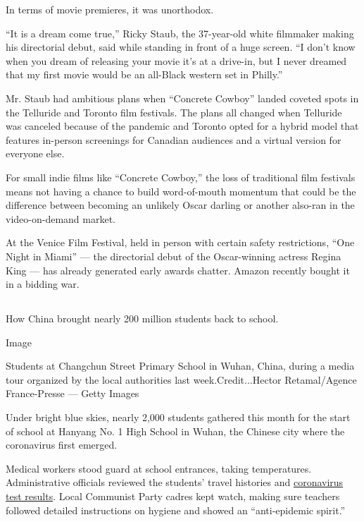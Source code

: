 In terms of movie premieres, it was unorthodox.

``It is a dream come true,'' Ricky Staub, the 37-year-old white
filmmaker making his directorial debut, said while standing in front of
a huge screen. ``I don't know when you dream of releasing your movie
it's at a drive-in, but I never dreamed that my first movie would be an
all-Black western set in Philly.''

Mr. Staub had ambitious plans when ``Concrete Cowboy'' landed coveted
spots in the Telluride and Toronto film festivals. The plans all changed
when Telluride was canceled because of the pandemic and Toronto opted
for a hybrid model that features in-person screenings for Canadian
audiences and a virtual version for everyone else.

For small indie films like ``Concrete Cowboy,'' the loss of traditional
film festivals means not having a chance to build word-of-mouth momentum
that could be the difference between becoming an unlikely Oscar darling
or another also-ran in the video-on-demand market.

At the Venice Film Festival, held in person with certain safety
restrictions, ``One Night in Miami'' --- the directorial debut of the
Oscar-winning actress Regina King --- has already generated early awards
chatter. Amazon recently bought it in a bidding war.

\hypertarget{-8}{%
\subsection{}\label{-8}}

How China brought nearly 200 million students back to school.

Image

Students at Changchun Street Primary School in Wuhan, China, during a
media tour organized by the local authorities last week.Credit...Hector
Retamal/Agence France-Presse --- Getty Images

Under bright blue skies, nearly 2,000 students gathered this month for
the start of school at Hanyang No. 1 High School in Wuhan, the Chinese
city where the coronavirus first emerged.

Medical workers stood guard at school entrances, taking temperatures.
Administrative officials reviewed the students' travel histories and
\href{https://www.nytimes3xbfgragh.onion/2020/05/26/world/asia/coronavirus-wuhan-tests.html}{coronavirus
test results}. Local Communist Party cadres kept watch, making sure
teachers followed detailed instructions on hygiene and showed an
``anti-epidemic spirit.''

